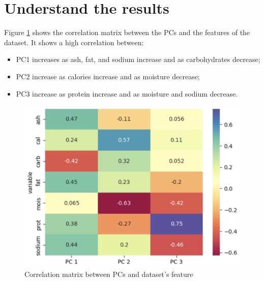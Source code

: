 \documentclass[../main.tex]{subfiles}
\begin{document}
\section{Understand the results}
Figure \ref{fig:correlation_matrix} shows the correlation matrix between the PCs and the features of the dataset. It shows a high correlation between:
\begin{itemize}
    \item PC1 increases as ash, fat, and sodium increase and as carbohydrates decrease;
    \item PC2 increase as calories increase and as moisture decrease;
    \item PC3 increase as protein increase and as moisture and sodium decrease.
\end{itemize}
\begin{figure}[H]
    \centering
    \includegraphics[width=\columnwidth]{img/correlationMatrix.png}
    \caption{Correlation matrix between PCs and dataset's feature}
    \label{fig:correlation_matrix}
\end{figure}
\end{document}
